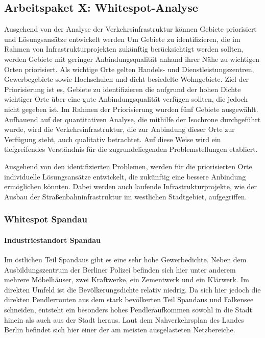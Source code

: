 \subsection{Arbeitspaket X: Whitespot-Analyse}



Ausgehend von der Analyse der Verkehrsinfrastruktur können Gebiete priorisiert und Lösungsansätze entwickelt werden
Um Gebiete zu identifizieren, die im Rahmen von Infrastrukturprojekten zukünftig berücksichtigt werden sollten, werden Gebiete mit geringer Anbindungsqualität anhand ihrer Nähe zu wichtigen Orten priorisiert. Als wichtige Orte gelten Handels- und Dienstleistungszentren, Gewerbegebiete sowie Hochschulen und dicht besiedelte Wohngebiete. Ziel der Priorisierung ist es, Gebiete zu identifizieren die aufgrund der hohen Dichte wichtiger Orte über eine gute Anbindungsqualität verfügen sollten, die jedoch nicht gegeben ist. Im Rahmen der Priorisierung wurden fünf Gebiete ausgewählt. Aufbauend auf der quantitativen Analyse, die mithilfe der Isochrone durchgeführt wurde, wird die Verkehrsinfrastruktur, die zur Anbindung dieser Orte zur Verfügung steht, auch qualitativ betrachtet. Auf diese Weise wird ein tiefgreifendes Verständnis für die zugrundeliegenden Problemstellungen etabliert.

Ausgehend von den identifizierten Problemen, werden für die priorisierten Orte individuelle Lösungsansätze entwickelt, die zukünftig eine bessere Anbindung ermöglichen könnten. Dabei werden auch laufende Infrastrukturprojekte, wie der Ausbau der Straßenbahninfrastruktur im westlichen Stadtgebiet, aufgegriffen.



\subsubsection{Whitespot Spandau}
\paragraph{Industriestandort Spandau}
Im östlichen Teil Spandaus gibt es eine sehr hohe Gewerbedichte. Neben dem Ausbildungszentrum der Berliner Polizei befinden sich hier unter anderem mehrere Möbelhäuser, zwei Kraftwerke, ein Zementwerk und ein Klärwerk. Im direkten Umfeld ist die Bevölkerungsdichte relativ niedrig. Da sich hier jedoch die direkten Pendlerrouten aus dem stark bevölkerten Teil Spandaus und Falkensee schneiden, entsteht ein besonders hohes Pendleraufkommen sowohl in die Stadt hinein als auch aus der Stadt heraus. Laut dem Nahverkehrsplan des Landes Berlin befindet sich hier einer der am meisten ausgelasteten Netzbereiche.

